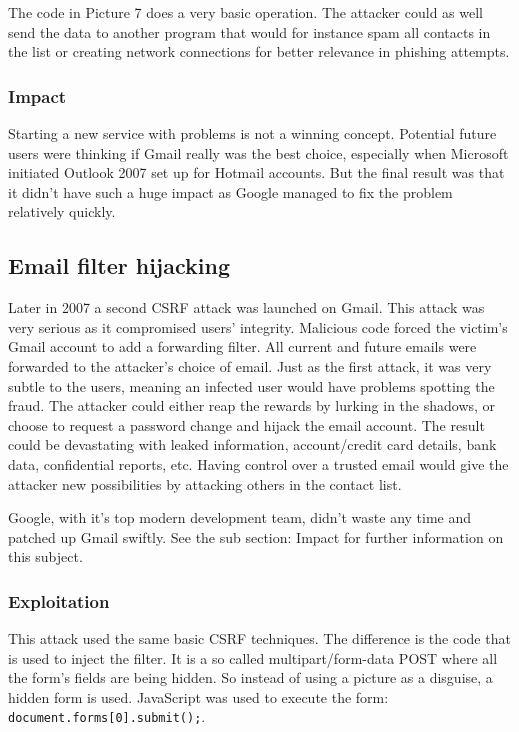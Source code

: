 \documentclass[a4paper,11pt,openany]{report}
\begin{document}
  The code in Picture 7 does a very basic operation. The attacker could as well send the data to another program 
  that would for instance spam all contacts in the list or creating network connections for better relevance in 
  phishing attempts.
  
  \subsubsection{Impact}
  Starting a new service with problems is not a winning concept. Potential future users were thinking if Gmail 
  really was the best choice, especially when Microsoft initiated Outlook 2007 set up for Hotmail accounts. 
  But the final result was that it didn't have such a huge impact as Google managed to fix the problem relatively
  quickly.
  
  
  \subsection{Email filter hijacking}
  Later in 2007 a second CSRF attack was launched on Gmail. This attack was very serious as it compromised 
  users' integrity. Malicious code forced the victim's Gmail account to add a forwarding filter. All current 
  and future emails were forwarded to the attacker's choice of email. Just as the first attack, it was very 
  subtle to the users, meaning an infected user would have problems spotting the fraud. The attacker could 
  either reap the rewards by lurking in the shadows, or choose to request a password change and hijack the 
  email account. The result could be devastating with leaked information, account/credit card details, bank 
  data, confidential reports, etc. Having control over a trusted email would give the attacker new possibilities 
  by attacking others in the contact list.
  
  Google, with it's top modern development team, didn't waste any time and patched up Gmail swiftly. See the
  sub section: Impact for further information on this subject.
  
  \subsubsection{Exploitation}
  This attack used the same basic CSRF techniques. The difference is the code that is used to inject the filter.
  It is a so called multipart/form-data POST where all the form's fields are being hidden. So instead of using
  a picture as a disguise, a hidden form is used. JavaScript was used to execute the form: 
  \texttt{document.forms[0].submit();}.
  
\end{document}

